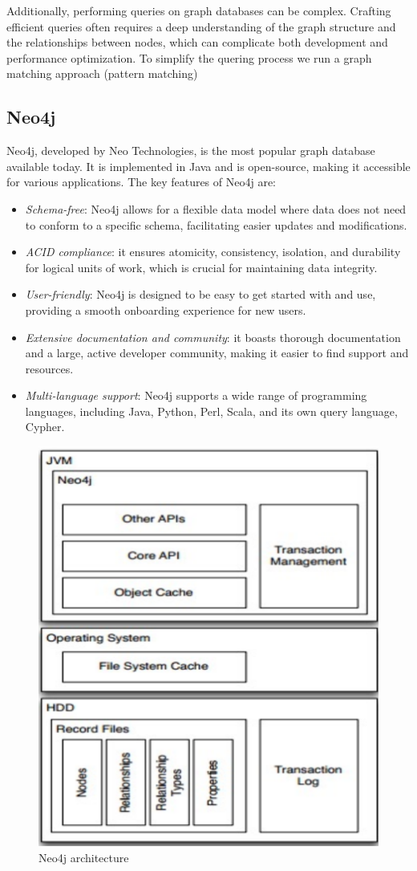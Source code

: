 Additionally, performing queries on graph databases can be complex. 
Crafting efficient queries often requires a deep understanding of the graph structure and the relationships between nodes, which can complicate both development and performance optimization.
To simplify the quering process we run a graph matching approach (pattern matching)

\subsection{Neo4j}
Neo4j, developed by Neo Technologies, is the most popular graph database available today. 
It is implemented in Java and is open-source, making it accessible for various applications.
The key features of Neo4j are: 
\begin{itemize}
    \item \textit{Schema-free}: Neo4j allows for a flexible data model where data does not need to conform to a specific schema, facilitating easier updates and modifications.
    \item \textit{ACID compliance}: it ensures atomicity, consistency, isolation, and durability for logical units of work, which is crucial for maintaining data integrity.
    \item \textit{User-friendly}: Neo4j is designed to be easy to get started with and use, providing a smooth onboarding experience for new users.
    \item \textit{Extensive documentation and community}: it boasts thorough documentation and a large, active developer community, making it easier to find support and resources.
    \item \textit{Multi-language support}: Neo4j supports a wide range of programming languages, including Java, Python, Perl, Scala, and its own query language, Cypher.
\end{itemize}
\begin{figure}[H]
    \centering
    \includegraphics[width=0.75\linewidth]{images/neo4j.png}
    \caption{Neo4j architecture}
\end{figure}
